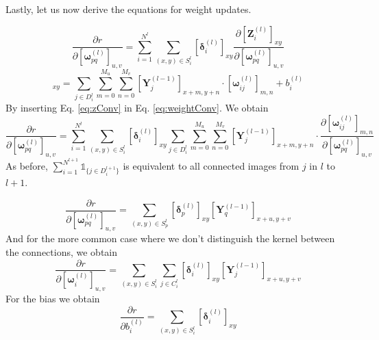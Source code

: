 \documentclass[a4paper,10pt]{article}
\theoremstyle{definition}
\begin{document}
Lastly, let us now derive the equations for weight updates.

\begin{equation}
\frac{\partial r}{\partial [\pmb{\omega}_{pq}^{(l)}]_{u,v}} = \sum_{i = 1}^{N^{l}}\sum_{(x,y) \in S^{l}_i} [\pmb{\delta}_i^{(l)}]_{xy} \frac{\partial [\pmb{Z}^{(l)}_i]_{xy}}{\partial [\pmb{\omega}_{pq}^{(l)}]_{u,v}}
\label{eq:weightConv}
\end{equation}
\begin{equation}
[\pmb{Z}^{(k)}_i]_{xy} = \sum_{j \in D_i^{l}} \sum_{m = 0}^{M_u} \sum_{n = 0}^{M_v} [\pmb{Y}_j^{(l-1)}]_{x + m, y + n} \cdot [\pmb{\omega}_{ij}^{(l)}]_{m,n} + b^{(l)}_i
\label{eq:zConv}
\end{equation}
By inserting Eq. \ref{eq:zConv} in Eq. \ref{eq:weightConv}. We obtain
\begin{equation}
\frac{\partial r}{\partial [\pmb{\omega}_{pq}^{(l)}]_{u,v}} = \sum_{i = 1}^{N^{l}}\sum_{(x,y) \in S^{l}_i} [\pmb{\delta}_i^{(l)}]_{xy} \sum_{j \in D_i^{l}} \sum_{m = 0}^{M_u} \sum_{n = 0}^{M_v} [\pmb{Y}_j^{(l-1)}]_{x + m, y + n} \cdot \frac{\partial[\pmb{\omega}_{ij}^{(l)}]_{m,n}}{\partial[\pmb{\omega}_{pq}^{(l)}]_{u,v}}
\end{equation}
As before,  $\sum_{i = 1}^{N^{l+1}}\mathds{1}_{\{j \in D^{l+1}_i\}}$ is equivalent to all connected images from $j$ in $l$ to $l+1$.

\begin{equation}
\frac{\partial r}{\partial [\pmb{\omega}_{pq}^{(l)}]_{u,v}} = \sum_{(x,y) \in S^{l}_p}[\pmb{\delta}_p^{(l)}]_{xy} [\pmb{Y}_q^{(l-1)}]_{x + u, y + v}
\end{equation}
And for the more common case where we don't distinguish the kernel between the connections, we obtain
\begin{equation}
\frac{\partial r}{\partial [\pmb{\omega}_{i}^{(l)}]_{u,v}} = \sum_{(x,y) \in S^{l}_i} \sum_{j \in C^{l}_i}[\pmb{\delta}_i^{(l)}]_{xy} [\pmb{Y}_j^{(l-1)}]_{x + u, y + v}
\end{equation}
For the bias we obtain
\begin{equation}
\frac{\partial r}{\partial b^{(l)}_i} =  \sum_{(x,y) \in S^{l}_i}  [\pmb{\delta}_i^{(l)}]_{xy}
\end{equation}
\end{document}

